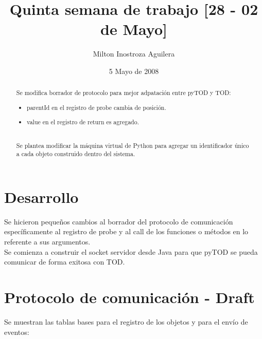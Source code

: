 \documentclass[10pt,a4paper]{article}
\begin{document}
\renewcommand{\contentsname}{Indice} 
\renewcommand\listfigurename{Lista de Figuras}
\renewcommand\listtablename{Lista de Tablas}
\newcommand\bibname{Bibliografía}
\renewcommand{\refname}{Bibliografía}
\renewcommand\indexname{Indice alfabético}
\renewcommand\figurename{Figura}
\renewcommand\tablename{Tabla}
\renewcommand\partname{Parte}
\newcommand\chaptername{Capítulo}
\renewcommand\appendixname{Apéndice}
\renewcommand\abstractname{Resumen}

\title{Quinta semana de trabajo [28 - 02 de Mayo]}
\author{Milton Inostroza Aguilera}
\date{5 Mayo de 2008}
\clearpage
\maketitle

\begin{abstract}

Se modifica borrador de protocolo para mejor adpatación entre pyTOD y TOD:
\begin{itemize}
\item parentId en el registro de probe cambia de posición.
\item value en el registro de return es agregado.
\end{itemize}
\\
Se plantea modificar la máquina virtual de Python para agregar un identificador único a cada objeto construido dentro del sistema.


\end{abstract}
\newpage
\tableofcontents
\newpage
\listoffigures
\newpage
\listoftables
\newpage
\section{Desarrollo}

Se hicieron pequeños cambios al borrador del protocolo de comunicación específicamente al registro de probe y al call de los funciones o métodos en lo referente a sus argumentos.\\

Se comienza a construir el socket servidor desde Java para que pyTOD se pueda comunicar de forma exitosa con TOD.


\section{Protocolo de comunicación - Draft}

Se muestran las tablas bases para el registro de los objetos y para el envío de eventos:
\end{document}
